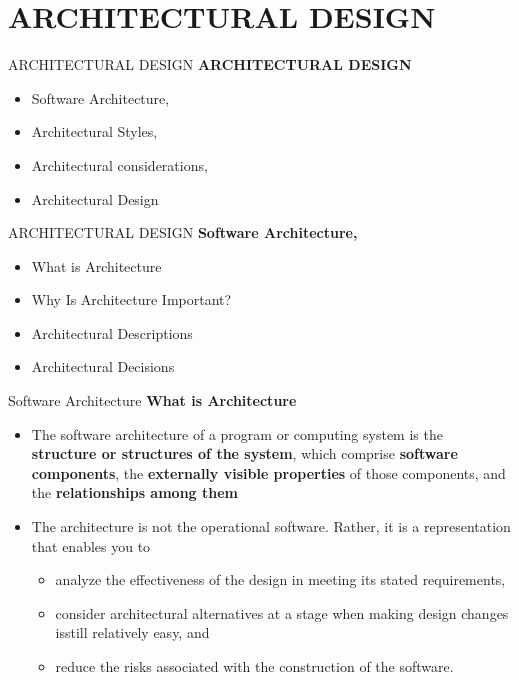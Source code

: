 \documentclass{beamer}
\begin{document}
\section{ARCHITECTURAL DESIGN}
\begin{frame}{ARCHITECTURAL DESIGN}
	\textbf{ARCHITECTURAL DESIGN}
	\begin{itemize}
		\item Software Architecture, 
		\item Architectural Styles, 
		\item Architectural considerations, 
		\item Architectural Design
	\end{itemize}
\end{frame}
\begin{frame}{ARCHITECTURAL DESIGN}
	\textbf{Software Architecture, }
	\begin{itemize}
		\item What is Architecture
		\item Why Is  Architecture Important?
		\item  Architectural Descriptions
		\item  Architectural Decisions
	\end{itemize}
\end{frame}
\begin{frame}{Software Architecture}
	\textbf{ What is Architecture}
	\begin{itemize}
		\item The software architecture of a program or computing system is the \textbf{structure or structures of the 
			system}, which comprise \textbf{software components}, the \textbf{externally visible properties} of those 
		components, and the \textbf{relationships among them}
		\item The architecture is not the operational software. Rather, it is a representation that enables 
		you to
		\begin{itemize}
			\item analyze the effectiveness of the design in meeting its stated requirements,
			\item consider architectural alternatives at a stage when making design 
			changes isstill relatively easy, and
			\item reduce the risks associated with the construction of the software.

		\end{itemize}
	\end{itemize}
\end{frame}
\end{document}
